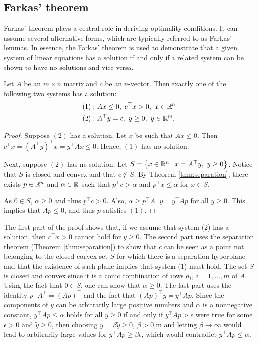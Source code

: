 \subsection{Farkas' theorem}

Farkas' theorem plays a central role in deriving optimality conditions. It can assume several alternative forms, which are typically referred to as Farkas' lemmas. In essence, the Farkas' theorem is used to demonstrate that a given system of linear equations has a solution if and only if a related system can be shown to have no solutions and vice-versa. 

\begin{theorem}
	Let $A$ be an $m \times n$ matrix and $c$ be an $n$-vector. Then exactly one of the following two systems has a solution:
	\begin{align*}
		(1) :~ &Ax \leq 0, \ c^\top x > 0, \ x \in \mathbb{R}^n\\
		(2) :~ &A^\top y = c, \ y \geq 0, \ y \in \mathbb{R}^m.  
	\end{align*}
\end{theorem}

\begin{proof}
	Suppose $(2)$ has a solution. Let $x$ be such that $Ax \leq 0$. Then $c^\top x = (A^\top y)^\top x = y^\top Ax \leq 0$. Hence, $(1)$ has no solution. 
	
	Next, suppose $(2)$ has no solution. Let $S = \left\{ x \in \mathbb{R}^n : x = A^\top y, \ y \geq 0 \right \}$. \hspace{-3pt}Notice that $S$ is closed and convex and that $c \notin S$. By Theorem \ref{thm:separation}, there exists $p \in \mathbb{R}^n$ and $\alpha \in \mathbb{R}$ such that $p^\top c > \alpha$ and $p^\top x \leq \alpha$ for $x \in S$. 
	
	As $0 \in S$, $\alpha \geq 0$ and thus $p^\top c > 0$. Also, $\alpha \geq p^\top A^\top y = y^\top Ap$ for all $y \geq 0$. This implies that $Ap \leq 0$, and thus $p$ satisfies $(1)$. 
\end{proof}

The first part of the proof shows that, if we assume that system (2) has a solution, then $c^\top x > 0$ cannot hold for $y \geq 0$. The second part uses the separation theorem (Theorem \ref{thm:separation}) to show that $c$ can be seen as a point not belonging to the closed convex set $S$ for which there is a separation hyperplane and that the existence of such plane implies that system (1) must hold. The set $S$ is closed and convex since it is a conic combination of rows $a_i$, $i=1, \dots, m$ of $A$. Using the fact that $0 \in S$, one can show that $\alpha \geq 0$. The last part uses the identity $p^\top A^\top  = (Ap)^\top$ and the fact that $(Ap)^\top y = y^\top Ap$. Since the components of $y$ can be arbitrarily large positive numbers and $\alpha$ is a nonnegative constant, $y^\top Ap \leq \alpha$ holds for all $y \ge 0$ if and only if $y^\top Ap > \epsilon$ were true for some $\epsilon>0$ and $\tilde{y}\ge 0$, then choosing $y = \beta\tilde{y} \ge 0$, $\beta > 0$,m and letting $\beta \to \infty$ would lead to arbitrarily large values for $y^\top Ap \ge \beta \epsilon$, which would contradict $y^\top Ap \le \alpha$.

